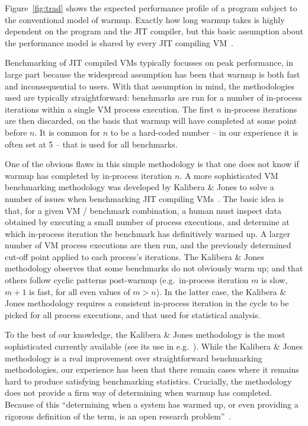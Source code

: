 \documentclass[preprint,numbers,10pt]{sigplanconf}
\newcommand{\kalibera}{Kalibera \& Jones\xspace}
\begin{document}
Figure~\ref{fig:trad} shows the expected performance profile of a
program subject to the conventional model of warmup. Exactly how long warmup
takes is highly dependent on
the program and the JIT compiler, but this basic assumption about the
performance model is shared by every JIT compiling
VM~\cite{kalibera13rigorous}.

Benchmarking of JIT compiled VMs typically focusses on peak
performance, in large part because the widespread assumption has been that
warmup is both fast and inconsequential to users. With that assumption in mind, the
methodologies used are typically straightforward: benchmarks are run for a number
of in-process iterations within a single VM process execution.
The first $n$ in-process iterations are then discarded, on the basis that warmup
will have completed at some point before $n$. It is common for
$n$ to be a hard-coded number -- in our experience it is often set at 5 --
that is used for all benchmarks.

One of the obvious flaws in this simple methodology is that one does not know if warmup
has completed by in-process iteration $n$. A more sophisticated VM benchmarking methodology
was developed by \kalibera to solve a number of issues when benchmarking JIT
compiling VMs~\cite{kalibera12quantifying,kalibera13rigorous}. The basic idea is
that, for a given VM / benchmark combination, a human must inspect data obtained by
executing a small number of process executions, and determine at which in-process iteration the
benchmark has definitively warmed up. A larger number of VM process executions are then
run, and the previously determined cut-off point applied to each process's
iterations. The \kalibera methodology observes that some benchmarks do not
obviously warm up; and that others follow cyclic patterns post-warmup
(e.g.~in-process iteration $m$ is slow, $m+1$ is fast, for all even values of $m > n$). In
the latter case, the \kalibera methodology requires a consistent in-process iteration in
the cycle to be picked for all process executions, and that used for statistical analysis.

To the best of our knowledge, the \kalibera methodology is the most
sophisticated currently available (see its use in
e.g.~\cite{barrett15approaches,grimmer15dynamically}). While the \kalibera
methodology is a real improvement over straightforward benchmarking methodologies,
our experience has been that there remain cases where it remains hard to produce
satisfying benchmarking statistics. Crucially, the methodology does not
provide a firm way of determining when warmup has completed. Because of this
``determining when a system has warmed up, or even providing a
rigorous definition of the term, is an open research problem''~\cite{seaton15phd}.
\end{document}

